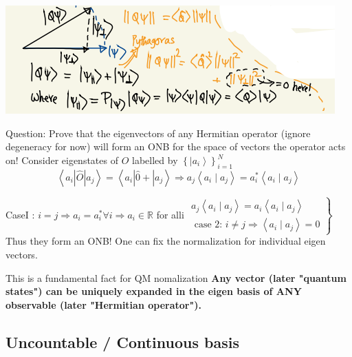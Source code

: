 \documentclass{article}
\begin{document}
\includegraphics[width = 0.4 \textwidth]{Lecture12/3.png}

Question: Prove that the eigenvectors of any Hermitian operator (ignore degeneracy for now) will form an ONB for the space of vectors the operator acts on!
Consider eigenstates of $\hat{O}$ labelled by $\left\{\left|a_{i}\right\rangle\right\}_{i=1}^{N}$
$$
\left\langle a_{i}|\hat{O}| a_{j}\right\rangle=\left\langle a_{i}|\hat{0}+| a_{j}\right\rangle \Rightarrow a_{j}\left\langle a_{i} \mid a_{j}\right\rangle=a_{i}^{*}\left\langle a_{i} \mid a_{j}\right\rangle
$$


CaseI : $i=j \Rightarrow a_{i}=a_{i}^{*} \forall i \Rightarrow a_{i} \in \mathbb{R}$ for alli
$\left.\begin{array}{l}a_{j}\left\langle a_{i} \mid a_{j}\right\rangle=a_{i}\left\langle a_{i} \mid a_{j}\right\rangle \\ \text { case 2: } i \neq j \Rightarrow\left\langle a_{i} \mid a_{j}\right\rangle=0\end{array}\right\}$ Thus they form an ONB! One can fix the normalization for individual eigen vectors. 


This is a fundamental fact for QM
nomalization
\textbf{Any vector (later "quantum states") can be uniquely expanded in the eigen basis of ANY observable (later "Hermitian operator").}

\subsection{Uncountable / Continuous basis}
\end{document}
